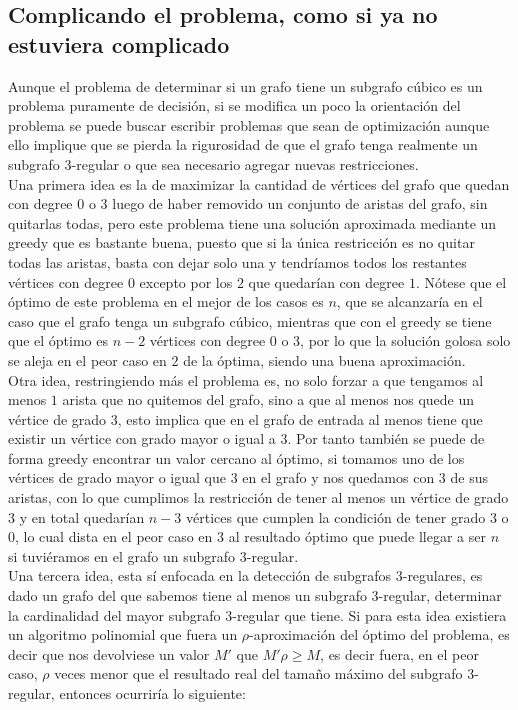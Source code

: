 \documentclass{article}
\begin{document}
	

\subsection*{Complicando el problema, como si ya no estuviera complicado}
Aunque el problema de determinar si un grafo tiene un subgrafo c\'ubico es un problema puramente de decisi\'on, 
si se modifica un poco la orientaci\'on del problema se puede buscar escribir problemas que sean de optimizaci\'on 
aunque ello implique que se pierda la rigurosidad de que el grafo tenga realmente un subgrafo $3$-regular o que 
sea necesario agregar nuevas restricciones.\\


Una primera idea es la de maximizar la cantidad de v\'ertices del grafo que quedan con degree $0$ o $3$ luego de haber 
removido un conjunto de aristas del grafo, sin quitarlas todas, pero este problema tiene una soluci\'on aproximada mediante un greedy 
que es bastante buena, puesto que si la \'unica restricci\'on es no quitar todas las aristas, basta con dejar solo una 
y tendr\'iamos todos los restantes v\'ertices con degree $0$ excepto por los $2$ que quedar\'ian con degree $1$. N\'otese que el 
\'optimo de este problema en el mejor de los casos es $n$, que se alcanzar\'ia en el caso que el grafo tenga un subgrafo c\'ubico, mientras 
que con el greedy se tiene que el \'optimo es $n-2$ v\'ertices con degree $0$ o  $3$, por lo que la soluci\'on golosa solo se aleja en el peor caso 
en $2$ de la \'optima, siendo una buena aproximaci\'on.\\ 

Otra idea, restringiendo m\'as el problema es, no solo forzar a que tengamos al menos $1$ arista que no quitemos del grafo, sino 
a que al menos nos quede un v\'ertice de grado $3$, esto implica que en el grafo de entrada al menos tiene que existir un v\'ertice con grado 
mayor o igual a $3$. Por tanto tambi\'en se puede de forma greedy encontrar un valor cercano al \'optimo, si tomamos uno de los v\'ertices de grado mayor  
o igual que $3$ en el grafo y nos quedamos con $3$ de sus aristas, con lo que cumplimos la restricci\'on de tener al menos un v\'ertice de grado $3$ y en total 
quedar\'ian $n-3$ v\'ertices que cumplen la condici\'on de tener grado $3$ o $0$, lo cual dista en el peor caso en $3$ al resultado \'optimo que puede llegar a ser $n$
si tuvi\'eramos en el grafo un subgrafo $3$-regular.\\ 

Una tercera idea, esta s\'i enfocada en la detecci\'on de subgrafos $3$-regulares, es dado un grafo del que sabemos tiene al menos un subgrafo $3$-regular, determinar la cardinalidad del 
mayor subgrafo $3$-regular que tiene. Si para esta idea existiera un algoritmo polinomial que fuera un $\rho$-aproximaci\'on del \'optimo del problema, es decir que nos devolviese un valor $M'$
que $M'\rho \geq M$, es decir fuera, en el peor caso, $\rho$ veces menor que el resultado real del tama\~no m\'aximo del subgrafo $3$-regular, entonces ocurrir\'ia lo siguiente: \\ 
\end{document}
